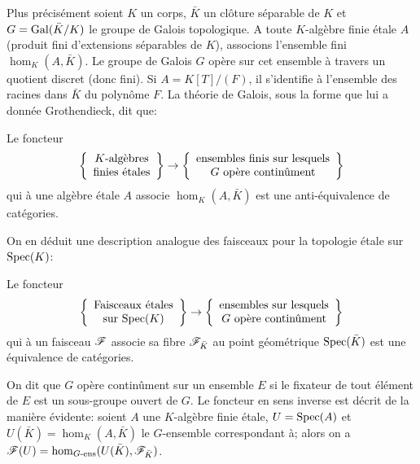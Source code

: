 \documentclass[oneside]{book}
\begin{document}
Plus précisément soient $K$ un corps, $\bar K$ un clôture séparable de $K$ et 
$G = \operatorname{Gal}(\bar K/K)$ le groupe de Galois topologique. A toute $K$-algèbre finie 
étale $A$ (produit fini d'extensions séparables de $K$), associons l'ensemble 
fini $\hom_K(A,\bar K)$. Le groupe de Galois $G$ opère sur cet ensemble à 
travers un quotient discret (donc fini). Si $A=K[T]/(F)$, il s'identifie à 
l'ensemble des racines dans $\bar K$ du polynôme $F$. La théorie de Galois, 
sous la forme que lui a donnée Grothendieck, dit que:





\begin{proposition}\label{I:2-4-3}
Le foncteur 
\[
  \left\{\begin{array}{c}
          \textnormal{$K$-algèbres} \\ 
          \textnormal{finies étales}
        \end{array}\right\}
  \to  
  \left\{\begin{array}{c}
          \textnormal{ensembles finis sur lesquels} \\
          \textnormal{$G$ opère continûment}
        \end{array}\right\}
\]
qui à une algèbre étale $A$ associe $\hom_K(A,\bar K)$ est une 
anti-équivalence de catégories.
\end{proposition}

On en déduit une description analogue des faisceaux pour la topologie étale sur 
$\operatorname{Spec}(K)$:





\begin{proposition}\label{I:2-4-4}
Le foncteur 
\[
  \left\{\begin{array}{c}
          \textnormal{Faisceaux étales} \\ 
          \textnormal{sur $\operatorname{Spec}(K)$}
        \end{array}\right\}
  \to 
  \left\{\begin{array}{c}
          \textnormal{ensembles sur lesquels} \\
          \textnormal{$G$ opère continûment}
        \end{array}\right\}
\]
qui à un 
faisceau $\mathscr{F}$ associe sa fibre $\mathscr{F}_{\bar K}$ au point géométrique 
$\operatorname{Spec}(\bar K)$ est une équivalence de catégories.
\end{proposition}

On dit que $G$ opère continûment sur un ensemble $E$ si le fixateur de tout 
élément de $E$ est un sous-groupe ouvert de $G$. Le foncteur en sens 
inverse est décrit de la manière évidente: soient $A$ une 
$K$-algèbre finie étale, $U=\operatorname{Spec}(A)$ et $U(\bar K)=\hom_K(A,\bar K)$ le 
$G$-ensemble correspondant à; alors on a 
$\mathscr{F}(U)= \hom_{G\text{-ens}}(U(\bar K),\mathscr{F}_{\bar K})$. 
\end{document}
